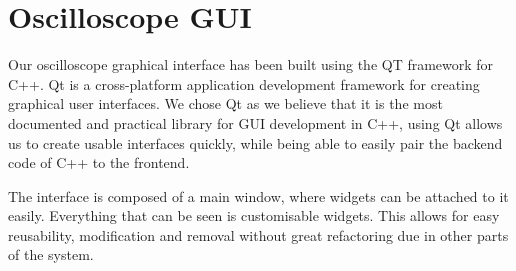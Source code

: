 \section{Oscilloscope GUI}
    Our oscilloscope graphical interface has been built using the QT framework for C++. Qt is a cross-platform application development framework for creating graphical user interfaces. \cite{qt-w} 
    We chose Qt as we believe that it is the most documented and practical library for GUI development in C++, using Qt allows us to create usable interfaces quickly, while being able to easily pair the backend code of C++ to the frontend.

    The interface is composed of a main window, where widgets can be attached to it easily. Everything that can be seen is customisable widgets. This allows for easy reusability, modification and removal without great refactoring due in other parts of the system.


